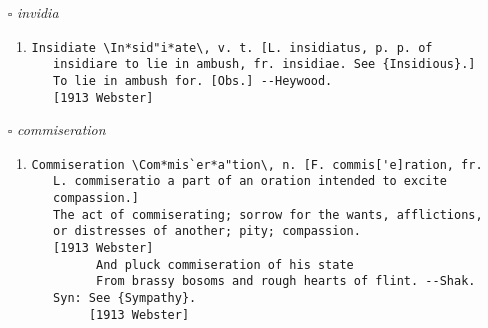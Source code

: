 \documentclass{article}
\begin{document}
\begin{itemize}
\begin{enumerate}
\item{
\begin{lstlisting}
Soakage \Soak"age\, n.
   The act of soaking, or the state of being soaked; also, the
   quantity that enters or issues by soaking.
   [1913 Webster]
\end{lstlisting}}
\end{enumerate}
\item[$\square$] \emph{ invidia }
\begin{enumerate}
\item{
\begin{lstlisting}
Insidiate \In*sid"i*ate\, v. t. [L. insidiatus, p. p. of
   insidiare to lie in ambush, fr. insidiae. See {Insidious}.]
   To lie in ambush for. [Obs.] --Heywood.
   [1913 Webster]
\end{lstlisting}}
\end{enumerate}
\item[$\square$] \emph{ commiseration }
\begin{enumerate}
\item{
\begin{lstlisting}
Commiseration \Com*mis`er*a"tion\, n. [F. commis['e]ration, fr.
   L. commiseratio a part of an oration intended to excite
   compassion.]
   The act of commiserating; sorrow for the wants, afflictions,
   or distresses of another; pity; compassion.
   [1913 Webster]
         And pluck commiseration of his state
         From brassy bosoms and rough hearts of flint. --Shak.
   Syn: See {Sympathy}.
        [1913 Webster]
\end{lstlisting}}
\end{enumerate}
\end{itemize}
\end{document}
